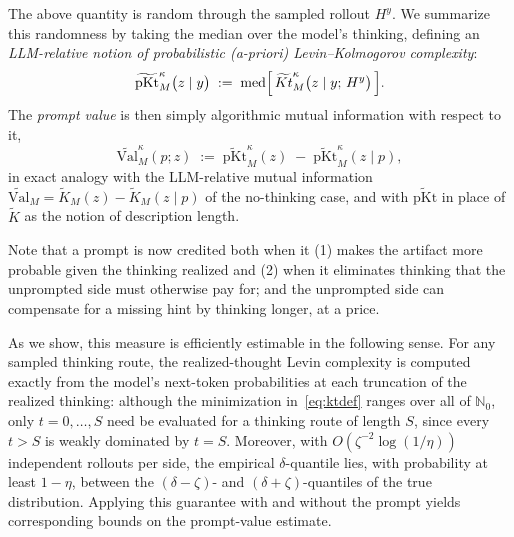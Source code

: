 \documentclass[letterpaper]{article} %
\theoremstyle{definition}
\theoremstyle{remark}
\newcommand{\Val}{\mathrm{Val}}
\DeclareMathOperator{\med}{med}
\newcommand{\pKt}{\mathrm{pKt}}
\newcommand{\pKtt}{\widetilde{\pKt}}
\begin{document}
The above quantity is random through the sampled rollout \(H^y\). We summarize
this randomness by taking the median over the model's thinking, defining an
\emph{LLM-relative notion of probabilistic (a-priori) Levin--Kolmogorov complexity}:
\begin{equation}\label{eq:intropkt}
\pKtt^{\kappa}_M\bigl(z \mid y\bigr)
\;:=\;
\med\Bigl[\,\widetilde{Kt}^{\kappa}_M
\bigl(z \mid y;\,H^y\bigr)\,\Bigr].
\end{equation}
The \emph{prompt value} is then simply algorithmic
mutual information with respect to it,
\begin{equation}\label{eq:introvalue}
\widetilde{\Val}^{\kappa}_M(p; z)
\;:=\;
\pKtt^{\kappa}_M(z)
\;-\;
\pKtt^{\kappa}_M(z \mid p) ,
\end{equation}
in exact analogy with the LLM-relative mutual information
$\widetilde{\Val}_M = \widetilde K_M(z) - \widetilde K_M(z \mid p)$ of the
no-thinking case, and with $\pKtt$ in place of $\widetilde K$ as the notion of
description length.

Note that a prompt is now credited both when it (1) makes the
artifact more probable given the thinking realized and (2) when it eliminates
thinking that the unprompted side must otherwise pay for; and the unprompted
side can compensate for a missing hint by thinking longer, at a price.

As we show, this measure is efficiently estimable in the following
sense. For any sampled thinking route, the realized-thought Levin complexity is
computed exactly from the model's next-token probabilities at each
truncation of the realized thinking: 
although the minimization in~\eqref{eq:ktdef} ranges over all of
\(\mathbb N_0\), only \(t=0,\ldots,S\) need be evaluated for a thinking route of
length \(S\), since every \(t>S\) is weakly dominated by \(t=S\). Moreover, with
$O(\zeta^{-2}\log(1/\eta))$ independent rollouts per side, the empirical
$\delta$-quantile lies, with probability at least $1-\eta$, between the
$(\delta-\zeta)$- and $(\delta+\zeta)$-quantiles of the true distribution.
Applying this guarantee with and without the prompt yields corresponding bounds on the prompt-value estimate.
\end{document}
